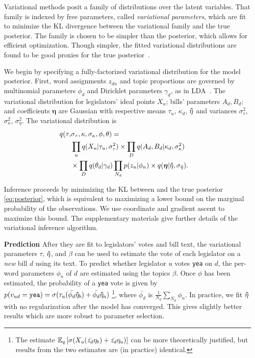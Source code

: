 Variational methods posit a family of distributions over the latent
variables.  That family is indexed by free parameters, called
\textit{variational parameters}, which are fit to minimize the KL
divergence between the variational family and the true posterior.  The
family is chosen to be simpler than the posterior, which allows for
efficient optimization.  Though simpler, the fitted variational
distributions are found to be good proxies for the true
posterior~\cite{jordan:1999}.


We begin by specifying a fully-factorized variational distribution for
the model posterior.  First, word assignments $z_{dn}$ and topic
proportions are governed by multinomial parameters $\phi_d$ and
Dirichlet parameters $\gamma_d$, as in LDA~\cite{blei:2003}.  The
variational distribution for legislators' ideal points $X_u$;
bills' parameters $A_d, B_d$; and coefficients $\bm \eta$ are Gaussian
with respective means $\tau_u$, $\kappa_d$, $\bm \hat \eta$ and variances
$\sigma_\tau^2$, $\sigma_\kappa^2$, $\sigma_\eta^2$. The variational
distribution is
\begin{align}
\label{eq:var_post}
q(\tau, & \sigma_\tau, \kappa, \sigma_\kappa, \phi, \theta) = \\
& \prod_u q(X_u | \tau_u, \sigma_\tau^2 ) \times \prod_D q(A_d, B_d |
\kappa_d, \sigma_\kappa^2 ) & \nonumber \\
\textstyle & \times \prod_D q(\theta_d | \gamma_d) \prod_{N_d} p(z_n |
\phi_n) \times q(\bm \eta | \bm \hat \eta, \sigma_{\bm \hat \eta}). \nonumber
\end{align}

Inference proceeds by minimizing the KL between  and
the true posterior \ref{eq:posterior}, which is equivalent to
maximizing a lower bound on the marginal probability of the
observations.  We use coordinate and gradient ascent to maximize this
bound.  The supplementary materials give further details of the
variational inference algorithm.

\textbf{Prediction} After they are fit to legislators' votes and bill
text, the variational parameters $\tau$, $\bm \hat \eta$, and $\beta$ can be
used to estimate the vote of each legislator on a \emph{new} bill $d$
using its text.  To predict whether legislator $u$ votes \verb!yea! on
$d$, the per-word parameters $\phi_n$ of $d$ are estimated using the
topics $\beta$. Once $\phi$ has been estimated, the probability of a
\verb!yea! vote is given by $p(v_{ud} = \verb!yea!)  = \sigma(\tau_u
(\bar{\phi_d} \ev_b) + \bar{\phi_d} \ev_a)$
\footnote{The estimate $\mathbb{E}_q\left[\sigma(X_u (\bar{z_d} \eta_b) +
    \bar{z_d} \eta_a)\right]$ can be more theoretically justified, but
  results from the two estimates are (in practice) identical.}, where
$\bar{\phi_d}$ is $\frac{1}{N_d} \sum_{N_d} \phi_n$.  In practice, we
fit $\bm \hat \eta$ with no regularization after the model has converged.  This
gives slightly better results which are more robust to parameter
selection.


